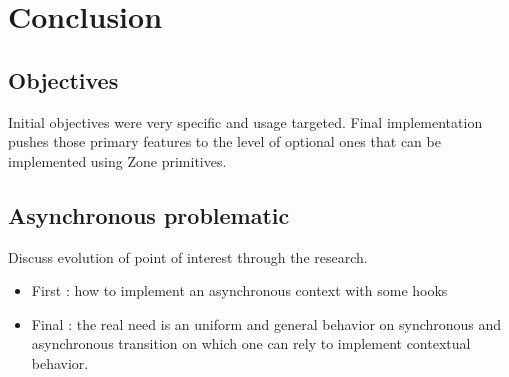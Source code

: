 
\chapter{Conclusion}

\section{Objectives}

Initial objectives were very specific and usage targeted. Final implementation pushes those primary features to the level of optional ones that can be implemented using Zone primitives.

\section{Asynchronous problematic}

Discuss evolution of point of interest through the research.

\begin{itemize}
\item First : how to implement an asynchronous context with some hooks
\item Final : the real need is an uniform and general behavior on synchronous and asynchronous transition on which one can rely to implement contextual behavior.
\end{itemize}